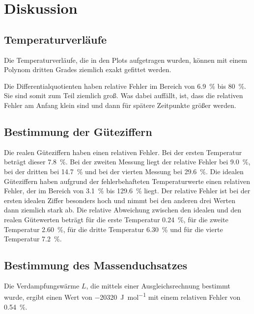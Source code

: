 \section{Diskussion}
\label{sec:Diskussion}

\subsection{Temperaturverläufe}
Die Temperaturverläufe, die in den Plots aufgetragen wurden, können mit einem 
Polynom dritten Grades ziemlich exakt gefittet werden. 

\noindent Die Differentialquotienten haben relative Fehler im Bereich von \SI{6.9}{\percent} 
bis \SI{80}{\percent}. Sie sind somit zum Teil ziemlich groß. Was dabei auffällt, ist, dass die relativen Fehler 
am Anfang klein sind und dann für spätere Zeitpunkte größer werden.

\subsection{Bestimmung der Güteziffern}
Die realen Güteziffern haben einen relativen Fehler. Bei der ersten Temperatur beträgt 
dieser \SI{7.8}{\percent}. Bei der zweiten Messung liegt der relative Fehler bei 
\SI{9.0}{\percent}, bei der dritten bei \SI{14.7}{\percent} und bei der 
vierten Messung bei \SI{29.6}{\percent}. 
Die idealen Güteziffern haben aufgrund der fehlerbehafteten Temperaturwerte einen 
relativen Fehler, der im Bereich von \SI{3.1}{\percent} bis \SI{129.6}{\percent} 
liegt. Der relative Fehler ist bei der ersten idealen Ziffer besonders hoch und nimmt bei den anderen drei Werten dann ziemlich stark ab. %
Die relative Abweichung zwischen den idealen und den realen Gütewerten beträgt für die 
erste Temperatur \SI{0.24}{\percent}, für die zweite Temperatur 
\SI{2.60}{\percent}, für die dritte Temperatur \SI{6.30}{\percent} und für die 
vierte Temperatur \SI{7.2}{\percent}.


\subsection{Bestimmung des Massenduchsatzes}
Die Verdampfungswärme $L$, die mittels einer Ausgleichsrechnung bestimmt wurde, 
ergibt einen Wert von \SI{-20320}{\joule\per\mol} mit einem relativen Fehler von 
\SI{0.54}{\percent}. %

